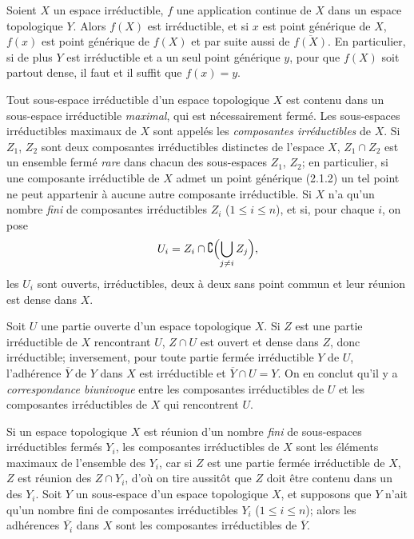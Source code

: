 
\begin{env}[2.1.5]
\label{0.2.1.5-fr}
Soient $X$ un espace irréductible, $f$ une application continue de $X$ dans un
espace topologique $Y$. Alors $f(X)$ est irréductible, et si $x$ est point
générique de $X$, $f(x)$ est point générique de $f(X)$ et par suite aussi de
$\overline{f(X)}$. En particulier, si de plus $Y$ est irréductible et a un seul
point générique $y$, pour que $f(X)$ soit partout dense, il faut et il suffit
que $f(x)=y$.
\end{env}

\begin{env}[2.1.6]
\label{0.2.1.6-fr}
Tout sous-espace irréductible d'un espace topologique $X$ est contenu dans un
sous-espace irréductible \emph{maximal}, qui est nécessairement fermé. Les
sous-espaces irréductibles maximaux de $X$ sont appelés les \emph{composantes
irréductibles} de $X$. Si $Z_1$, $Z_2$ sont deux composantes irréductibles
distinctes de l'espace $X$, $Z_1\cap Z_2$ est un ensemble fermé \emph{rare}
dans chacun des sous-espaces $Z_1$, $Z_2$; en particulier, si une composante
irréductible de $X$ admet un point générique (2.1.2) un tel point ne peut
appartenir à aucune autre composante irréductible. Si $X$ n'a qu'un nombre
\emph{fini} de composantes irréductibles $Z_i$ ($1\leq i\leq n$), et si, pour
chaque $i$, on pose
\[
  U_i=Z_i\cap\complement\Bigl(\bigcup_{j\neq i}Z_j\Bigr),
\]
les $U_i$ sont ouverts, irréductibles, deux à deux sans point commun et leur
réunion est dense dans $X$.

Soit $U$ une partie ouverte d'un espace topologique $X$. Si $Z$ est une partie
irréductible de $X$ rencontrant $U$, $Z\cap U$ est ouvert et dense dans $Z$,
donc irréductible; inversement, pour toute partie fermée irréductible $Y$ de
$U$, l'adhérence $\overline Y$ de $Y$ dans $X$ est irréductible et
$\overline Y\cap U=Y$. On en conclut qu'il y a \emph{correspondance
biunivoque} entre les composantes irréductibles de $U$ et les composantes
irréductibles de $X$ qui rencontrent $U$.
\end{env}

\begin{env}[2.1.7]
\label{0.2.1.7-fr}
Si un espace topologique $X$ est réunion d'un nombre \emph{fini} de
sous-espaces irréductibles fermés $Y_i$, les composantes irréductibles de $X$
sont les éléments maximaux de l'ensemble des $Y_i$, car si $Z$ est une partie
fermée irréductible de $X$, $Z$ est réunion des $Z\cap Y_i$, d'où on tire
aussitôt que $Z$ doit être contenu dans un des $Y_i$. Soit $Y$ un sous-espace
d'un espace topologique $X$, et supposons que $Y$ n'ait qu'un nombre fini de
composantes irréductibles $Y_i$ ($1\leq i\leq n$); alors les adhérences
$\overline{Y_i}$ dans $X$ sont les composantes irréductibles de $\overline Y$.
\end{env}

